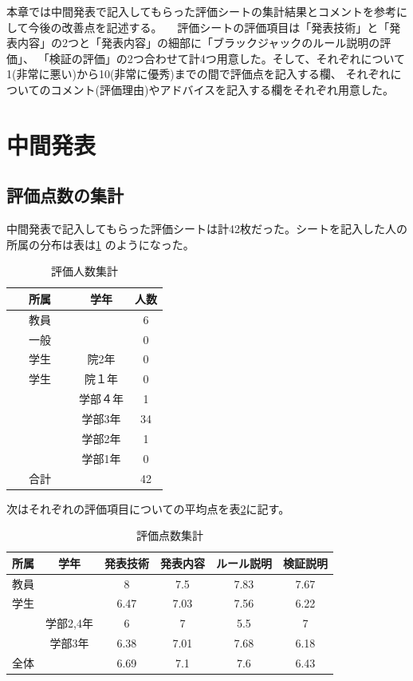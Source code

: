  本章では中間発表で記入してもらった評価シートの集計結果とコメントを参考にして今後の改善点を記述する。
　評価シートの評価項目は「発表技術」と「発表内容」の2つと「発表内容」の細部に「ブラックジャックのルール説明の評価」、
「検証の評価」の2つ合わせて計4つ用意した。そして、それぞれについて1(非常に悪い)から10(非常に優秀)までの間で評価点を記入する欄、
それぞれについてのコメント(評価理由)やアドバイスを記入する欄をそれぞれ用意した。
\section{中間発表}
\subsection{評価点数の集計}
中間発表で記入してもらった評価シートは計42枚だった。シートを記入した人の所属の分布は表は\ref{tab:dist} のようになった。

\begin{table}[htb]
  \begin{center}
    \caption{評価人数集計}
    \begin{tabular}{|c|c|c|} \hline 
      所属 & 学年 & 人数  \\ \hline \hline
      教員 &  & 6  \\
      一般 &  & 0 \\
      学生 & 院2年 & 0 \\
     学生 & 院１年 & 0 \\
             & 学部４年 & 1 \\
 　　　　　 & 学部3年 & 34 \\
             & 学部2年 & 1 \\
             & 学部1年 & 0 \\ \hline \hline
      合計 &  & 42 \\ \hline
    \end{tabular}
    \label{tab:dist}
  \end{center}
\end{table}
次はそれぞれの評価項目についての平均点を表\ref{tab:point}に記す。
\begin{table}[H]
\begin{center}
\caption{評価点数集計}
\begin{tabular}{|c|c|c|c|c|c|} \hline
  所属 & 学年 & 発表技術 & 発表内容 & ルール説明 & 検証説明  \\ \hline \hline
  教員 &        & 8 & 7.5 & 7.83 & 7.67 \\
  学生 &        & 6.47 & 7.03 & 7.56 & 6.22 \\
         & 学部2,4年 & 6 & 7 & 5.5 & 7 \\
         & 学部3年 & 6.38 & 7.01 & 7.68 & 6.18 \\ \hline \hline
  全体 &        & 6.69 & 7.1 & 7.6 & 6.43 \\ \hline
\end{tabular}
\label{tab:point}
\end{center}
\end{table}

